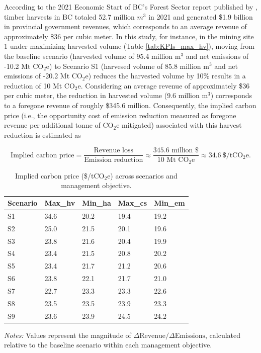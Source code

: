 \documentclass[preprint,12pt]{elsarticle}
\begin{document}
According to the 2021 Economic Start of BC's Forest Sector report published by \citet{BC_ForestSector_2021}, timber harvests in BC totaled 52.7 million $m^3$ in 2021 and generated \$1.9 billion in provincial government revenues, which corresponds to an average revenue of approximately \$36 per cubic meter. In this study, for instance, in the mining site 1 under maximizing harvested volume (Table \ref{tab:KPIs_max_hv}), moving from the baseline scenario (harvested volume of 95.4 million m$^3$ and net emissions of -10.2 Mt CO$_2$e) to Scenario S1 (harvesed volume of 85.8 million m$^3$ and net emissions of -20.2 Mt CO$_2$e) reduces the harvested volume by 10\% results in a reduction of 10 Mt CO$_2$e. Considering an average revenue of approximately \$36 per cubic meter, the reduction in harvested volume (9.6 million m$^3$) corresponds to a foregone revenue of roughly \$345.6 million. Consequently, the implied carbon price (i.e., the opportunity cost of emission reduction measured as foregone revenue per 
additional tonne of CO$_2$e mitigated) associated with this harvest reduction is estimated as

\[
\text{Implied carbon price} = \frac{\text{Revenue loss}}{\text{Emission reduction}} \approx \frac{345.6 \text{ million \$}}{10 \text{ Mt CO$_2$e}} \approx 34.6~\text{\$/tCO$_2$e}.
\]

\begin{table}[htbp]
\centering
\caption{Implied carbon price (\$/tCO$_2$e) across scenarios and management objective.}
\label{tab:implied_carbon_price_objectives}
\begin{tabular}{lllll}
\toprule
Scenario & Max\_hv & Min\_ha & Max\_cs & Min\_em \\
\midrule
S1 & 34.6 & 20.2 & 19.4 & 19.2 \\
S2 & 25.0 & 21.5 & 20.1 & 19.6 \\
S3 & 23.8 & 21.6 & 20.4 & 19.9 \\
S4 & 23.4 & 21.5 & 20.8 & 20.2 \\
S5 & 23.4 & 21.7 & 21.2 & 20.6 \\
S6 & 23.8 & 22.1 & 21.7 & 21.0 \\
S7 & 22.7 & 23.3 & 23.3 & 22.6 \\
S8 & 23.5 & 23.5 & 23.9 & 23.3 \\
S9 & 23.6 & 23.9 & 24.5 & 24.2 \\
\bottomrule
\end{tabular}

\vspace{2mm}
\footnotesize\emph{Notes:} Values represent the magnitude of 
$\Delta \text{Revenue}/\Delta \text{Emissions}$, calculated relative to the 
baseline scenario within each management objective.
\end{table}
\end{document}
